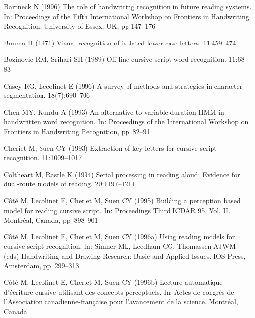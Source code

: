 \documentclass[ijdar]{svjour}
\begin{document}

\begin{thebibliography}{88}
 Bartneck N (1996)
\newblock The role of handwriting recognition in future reading systems.
\newblock In: {Proceedings of the Fifth International Workshop on Frontiers in
  Handwriting Recognition}. University of Essex, UK, pp 147--176

 Bouma H (1971)
\newblock Visual recognition of isolated lower-case letters.
 11:459--474

 Bozinovic RM, Srihari SH (1989)
\newblock Off-line cursive script word recognition.
 11:68--83


 Casey RG, Lecolinet E (1996)
\newblock A survey of methods and strategies in character segmentation.
18(7):690--706

 Chen MY, Kundu A (1993)
\newblock An alternative to variable duration HMM in handwritten word recognition.
\newblock In: {Proceedings of the International Workshop on Frontiers
in Handwriting Recognition}, pp~82--91

 Cheriet M, Suen CY (1993)
\newblock Extraction of key letters for cursive script recognition.
 11:1009--1017

 Coltheart M, Rastle K (1994)
\newblock Serial processing in reading aloud: Evidence for dual-route models of
  reading.
 20:1197--1211

 C\^ot\'e M, Lecolinet E, Cheriet M, Suen CY (1995)
\newblock Building a perception based model for reading cursive script.
\newblock In: {Proceedings Third ICDAR 95, Vol. II}.
Mon\-tr\'eal, Canada, pp~898--901

 C\^ot\'e M, Lecolinet E, Cheriet M, Suen CY (1996a)
\newblock Using reading models for cursive script recognition.
\newblock In: Simner ML, Leedham CG, Thomassen AJWM (eds) {Handwriting
and Drawing Research: Basic and Applied Issues}.
        IOS Press, Amsterdam, pp~299--313

 C\^ot\'e M, Lecolinet E, Cheriet M, Suen CY (1996b)
\newblock Lecture automatique d'\'ecriture cursive utilisant des concepts
  perceptuels.
\newblock In: {Actes de congr\`es de l'Association canadienne-fran\c{c}aise
  pour l'avancement de la science}. Montr\'eal, Canada


\end{thebibliography}
\end{document}
